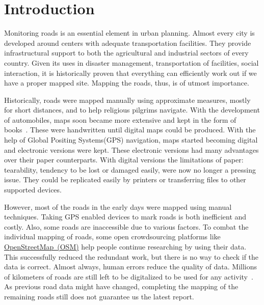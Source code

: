 \chapter{Introduction}\label{chapt:intro}

Monitoring roads is an essential element in urban planning. Almost every city is developed around centers with adequate transportation facilities. They provide infrastructural support to both the agricultural and industrial sectors of every country. Given its uses in disaster management, transportation of facilities, social interaction, it is historically proven that everything can efficiently work out if we have a proper mapped site. Mapping the roads, thus, is of utmost importance.

Historically, roads were mapped manually using approximate measures, mostly for short distances, and to help religious pilgrims navigate. With the development of automobiles, maps soon became more extensive and kept in the form of books~\cite{firstMapBooks}. These were handwritten until digital maps could be produced. With the help of Global Positing Systems(GPS) navigation, maps started becoming digital and electronic versions were kept. These electronic versions had many advantages over their paper counterparts. With digital versions the limitations of paper: tearability, tendency to be lost or damaged easily, were now no longer a pressing issue. They could be replicated easily by printers or transferring files to other supported devices.

However, most of the roads in the early days were mapped using manual techniques. Taking GPS enabled devices to mark roads is both inefficient and costly. Also, some roads are inaccessible due to various factors. To combat the individual mapping of roads, some open crowdsourcing platforms like \href{https://www.openstreetmap.org/}{OpenStreetMap~(OSM)}  help people continue researching by using their data. This successfully reduced the redundant work, but there is no way to check if the data is correct. Almost always, human errors reduce the quality of data. Millions of kilometers of roads are still left to be digitalized to be used for any activity~\cite{MapsDoneOSM}. As previous road data might have changed, completing the mapping of the remaining roads still does not guarantee us the latest report.

